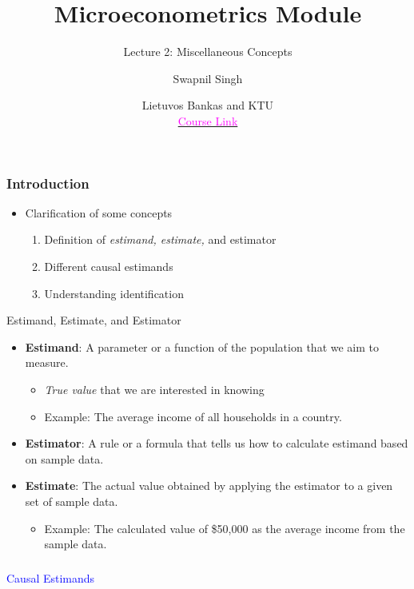 \documentclass{beamer}
\title{Microeconometrics Module}
\subtitle{Lecture 2: Miscellaneous Concepts}
\author{Swapnil Singh}
\date{Lietuvos Bankas and KTU \\ \href{https://github.com/swapnil1987/econometrics-2024}{\textcolor{magenta}{Course Link}}}
\begin{document}
	
	\maketitle


\begin{frame}
	\frametitle{Introduction}
	
	\begin{itemize}
		\item Clarification of some concepts
			\begin{enumerate}
				\item Definition of \emph{estimand, estimate,} and {estimator}
				\item Different causal estimands
				\item Understanding identification
			\end{enumerate}
	\end{itemize}
\end{frame}

\begin{frame}{Estimand, Estimate, and Estimator}
	\begin{itemize}
		\item \textbf{Estimand}: A parameter or a function of the population that we aim to measure. 
			\begin{itemize} 
				\item  \textit{True value} that we are interested in knowing 
				\item Example: The average income of all households in a country.
			\end{itemize}
		
		\item \textbf{Estimator}: A rule or a formula that tells us how to calculate  estimand based on sample data. 
		
		\item \textbf{Estimate}: The actual value obtained by applying the estimator to a given set of sample data. 
		\begin{itemize}
			\item Example: The calculated value of \$50,000 as the average income from the sample data.
		\end{itemize}
	\end{itemize}
\end{frame}

\begin{frame}
	\frametitle{}
	\begin{center}
		\Large\textcolor{blue}{Causal Estimands}
	\end{center}
\end{frame}
\end{document}
